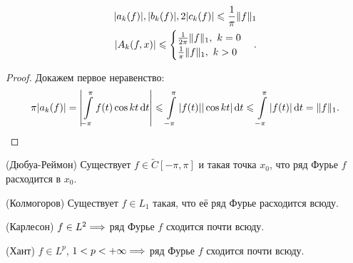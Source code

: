 \begin{lemma}
    \begin{align*}
        |a_k(f)|, |b_k(f)|, 2|c_k(f)| \leqslant \frac{1}{\pi} \norm{f}_1 \\
        |A_k(f, x)| \leqslant \begin{cases}
            \frac{1}{2\pi} \norm{f}_1,~ k = 0 \\
            \frac{1}{\pi} \norm{f}_1,~ k > 0
        \end{cases}
    .\end{align*}
\end{lemma}
\begin{proof}
    Докажем первое неравенство:
    \[
        \pi|a_k(f)| = \abs*{\intl_{-\pi}^\pi{f(t) \cos{kt} \dd t}} \leqslant
        \intl_{-\pi}^\pi{|f(t)| |\cos{kt}| \dd t} \leqslant
        \intl_{-\pi}^\pi{|f(t)| \dd t} = \norm{f}_1
    .\]
\end{proof}

\begin{remark}(Дюбуа-Реймон)
    Существует $f \in \widetilde{C}[-\pi, \pi]$ и такая точка $x_0$, что
    ряд Фурье $f$ расходится в $x_0$.
\end{remark}

\begin{remark}(Колмогоров)
    Существует $f \in L_1$ такая, что её ряд Фурье расходится всюду.
\end{remark}

\begin{theorem}(Карлесон)
    $f \in L^2 \Lra$ ряд Фурье $f$ сходится почти всюду.
\end{theorem}

\begin{theorem}(Хант)
    $f \in L^p$, $1 < p < +\infty \Lra$ ряд Фурье $f$ сходится почти всюду.  
\end{theorem}

